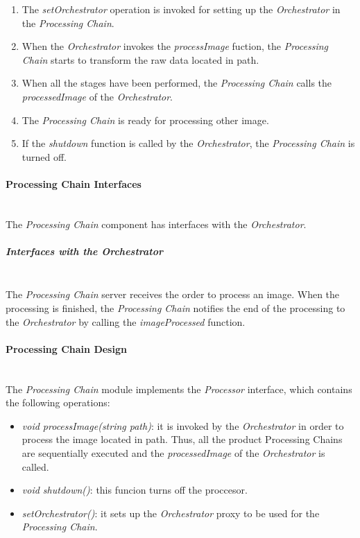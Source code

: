 \begin{enumerate}
\item The \emph{setOrchestrator} operation is invoked for setting up the
  \emph{Orchestrator} in the \emph{Processing Chain}.
\item When the \emph{Orchestrator} invokes the \emph{processImage} fuction, the
  \emph{Processing Chain} starts to transform the raw data located in path.
\item When all the stages have been performed, the \emph{Processing Chain} calls the
  \emph{processedImage} of the \emph{Orchestrator}.
\item The \emph{Processing Chain} is ready for processing other image.
\item If the \emph{shutdown} function is called by the \emph{Orchestrator}, the
 \emph{Processing Chain} is turned off.
\end{enumerate}


\paragraph{Processing Chain Interfaces}~\\

The \emph{Processing Chain} component has interfaces with the \emph{Orchestrator}.

\subparagraph{Interfaces with the Orchestrator}~\\

The \emph{Processing Chain} server receives the order to process an image. When the
processing is finished, the \emph{Processing Chain} notifies the end of the
processing to the \emph{Orchestrator} by
calling the \emph{imageProcessed} function.

\paragraph{Processing Chain Design}~\\

The \emph{Processing Chain} module implements the \emph{Processor} interface, which
contains the following operations:

\begin{itemize}
\item \emph{void processImage(string path)}: it is invoked by the
  \emph{Orchestrator} in order to process the image located in path. Thus, all
  the product Processing Chains are sequentially executed and the \emph{processedImage}
  of the \emph{Orchestrator} is called. 
\item \emph{void shutdown()}: this funcion turns off the proccesor.
\item \emph{setOrchestrator()}: it sets up the \emph{Orchestrator} proxy to be
  used for the \emph{Processing Chain}.
\end{itemize}

